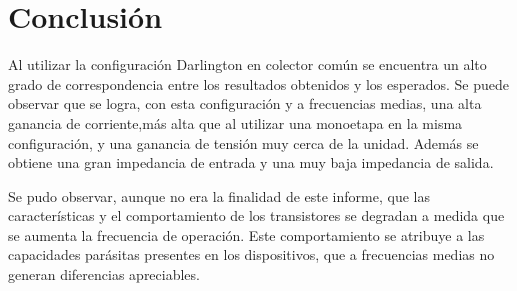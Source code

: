 \section{Conclusi\'on}

Al utilizar la configuraci\'on Darlington en colector com\'un se encuentra un alto grado de correspondencia entre los resultados obtenidos y los esperados. Se puede observar que se logra, con esta configuraci\'on y a frecuencias medias, una alta ganancia de corriente,m\'as alta que al utilizar una monoetapa en la misma configuraci\'on, y una ganancia de tensi\'on muy cerca de la unidad. Adem\'as se obtiene una gran impedancia de entrada y una muy baja impedancia de salida.

Se pudo observar, aunque no era la finalidad de este informe, que las caracter\'isticas y el comportamiento de los transistores se degradan a medida que se aumenta la frecuencia de operaci\'on. Este comportamiento se atribuye a las capacidades par\'asitas presentes en los dispositivos, que a frecuencias medias no generan diferencias apreciables.